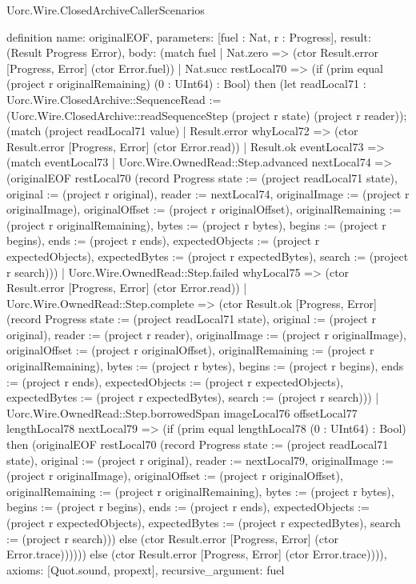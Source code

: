\begin{lexlean}{Uorc.Wire.ClosedArchiveCallerScenarios}
\begin{semanticmodule}
definition{
  name: originalEOF,
  parameters: [fuel : Nat, r : Progress],
  result: (Result Progress Error),
  body: (match fuel
    | Nat.zero => (ctor Result.error [Progress, Error] (ctor Error.fuel))
    | Nat.succ restLocal70 => (if (prim equal (project r originalRemaining) (0 : UInt64) : Bool) then (let readLocal71 : Uorc.Wire.ClosedArchive::SequenceRead := (Uorc.Wire.ClosedArchive::readSequenceStep (project r state) (project r reader)); (match (project readLocal71 value)
      | Result.error whyLocal72 => (ctor Result.error [Progress, Error] (ctor Error.read))
      | Result.ok eventLocal73 => (match eventLocal73
        | Uorc.Wire.OwnedRead::Step.advanced nextLocal74 => (originalEOF restLocal70 (record Progress {state := (project readLocal71 state), original := (project r original), reader := nextLocal74, originalImage := (project r originalImage), originalOffset := (project r originalOffset), originalRemaining := (project r originalRemaining), bytes := (project r bytes), begins := (project r begins), ends := (project r ends), expectedObjects := (project r expectedObjects), expectedBytes := (project r expectedBytes), search := (project r search)}))
        | Uorc.Wire.OwnedRead::Step.failed whyLocal75 => (ctor Result.error [Progress, Error] (ctor Error.read))
        | Uorc.Wire.OwnedRead::Step.complete => (ctor Result.ok [Progress, Error] (record Progress {state := (project readLocal71 state), original := (project r original), reader := (project r reader), originalImage := (project r originalImage), originalOffset := (project r originalOffset), originalRemaining := (project r originalRemaining), bytes := (project r bytes), begins := (project r begins), ends := (project r ends), expectedObjects := (project r expectedObjects), expectedBytes := (project r expectedBytes), search := (project r search)}))
        | Uorc.Wire.OwnedRead::Step.borrowedSpan imageLocal76 offsetLocal77 lengthLocal78 nextLocal79 => (if (prim equal lengthLocal78 (0 : UInt64) : Bool) then (originalEOF restLocal70 (record Progress {state := (project readLocal71 state), original := (project r original), reader := nextLocal79, originalImage := (project r originalImage), originalOffset := (project r originalOffset), originalRemaining := (project r originalRemaining), bytes := (project r bytes), begins := (project r begins), ends := (project r ends), expectedObjects := (project r expectedObjects), expectedBytes := (project r expectedBytes), search := (project r search)})) else (ctor Result.error [Progress, Error] (ctor Error.trace)))))) else (ctor Result.error [Progress, Error] (ctor Error.trace)))),
  axioms: [Quot.sound, propext],
  recursive_argument: fuel
}


\end{semanticmodule}
\end{lexlean}
